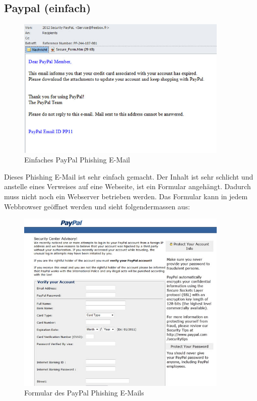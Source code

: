 \subsection{Paypal (einfach)}
\begin{figure}[H]
  \centering
  \includegraphics[width=0.9\textwidth]{images/phishing-beispiel-paypal1.jpg}
  \caption{Einfaches PayPal Phishing E-Mail}
  \label{fig:phishing:beispiele:paypaleinfachmail}
\end{figure}

Dieses Phishing E-Mail ist sehr einfach gemacht. Der Inhalt ist sehr schlicht und anstelle eines Verweises auf eine Webseite, ist ein Formular angehängt. Dadurch muss nicht noch ein Webserver betrieben werden. Das Formular kann in jedem Webbrowser geöffnet werden und sieht folgendermassen aus:

\begin{figure}[H]
  \centering
  \includegraphics[width=0.9\textwidth]{images/phishing-beispiel-paypal2.jpg}
  \caption{Formular des PayPal Phishing E-Mails}
  \label{fig:phishing:beispiele:paypaleinfachformular}
\end{figure}

